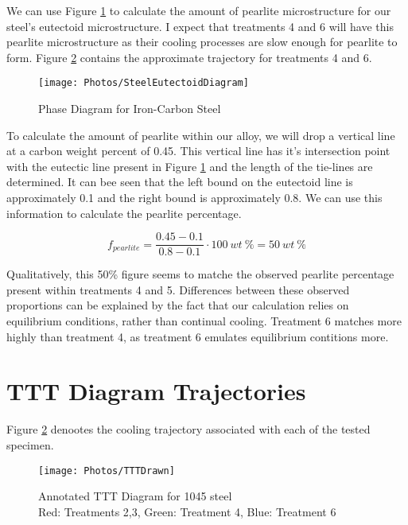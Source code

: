 \documentclass{article}
\begin{document}
We can use Figure \ref{fig:SteelEuDia} to calculate the amount of pearlite microstructure for our steel's eutectoid microstructure. I expect that treatments 4 and 6 will have this pearlite microstructure as their cooling processes are slow enough for pearlite to form. Figure \ref{fig:TTT} contains the approximate trajectory for treatments 4 and 6.

\begin{figure}[H]
\centering
\texttt{[image: Photos/SteelEutectoidDiagram]}
\caption{Phase Diagram for Iron-Carbon Steel}
\label{fig:SteelEuDia}
\end{figure}

To calculate the amount of pearlite within our alloy, we will drop a vertical line at a carbon weight percent of 0.45. This vertical line has it's intersection point with the eutectic line present in Figure \ref{fig:SteelEuDia} and the length of the tie-lines are determined. It can bee seen that the left bound on the eutectoid line is approximately 0.1 and the right bound is approximately 0.8. We can use this information to calculate the pearlite percentage.

\begin{equation}
f_{pearlite} = \frac{0.45 - 0.1}{0.8 - 0.1} \cdot 100~wt~\% = 50~wt~\% 
\end{equation}

Qualitatively, this 50\% figure seems to matche the observed pearlite percentage present within treatments 4 and 5. Differences between these observed proportions can be explained by the fact that our calculation relies on equilibrium conditions, rather than continual cooling. Treatment 6 matches more highly than treatment 4, as treatment 6 emulates equilibrium contitions more.


\section{TTT Diagram Trajectories}

Figure \ref{fig:TTT} denootes the cooling trajectory associated with each of the tested specimen.

\begin{figure}[H]
\centering
\texttt{[image: Photos/TTTDrawn]}
\caption{Annotated TTT Diagram for 1045 steel\\Red: Treatments 2,3, Green: Treatment 4, Blue: Treatment 6}
\label{fig:TTT}
\end{figure}
\end{document}
